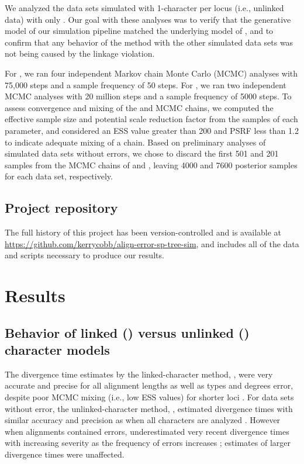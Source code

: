 We analyzed the data sets simulated with 1-character per locus (i.e., unlinked
data) with only \ecoevolity.
Our goal with these analyses was to
verify that the generative model of our simulation pipeline matched the
underlying model of \ecoevolity, and to confirm that any behavior of the method
with the other simulated data sets was not being caused by the linkage
violation.

For \ecoevolity, we ran four independent Markov chain Monte Carlo (MCMC)
analyses with 75,000 steps and a sample frequency of 50 steps.
For \beast, we ran two independent MCMC analyses with 20 million steps and a
sample frequency of 5000 steps. 
To assess convergence and mixing of the \ecoevolity and \beast MCMC chains, we
computed the effective sample size
\citep[ESS;][]{Gong2014}
and potential scale reduction factor
\citep[PSRF; the square root of Equation 1.1 in][]{Brooks1998}
from the samples of each parameter, and considered an ESS value greater
than 200 and PSRF less than 1.2 \citep{gelman1998} to indicate adequate mixing
of a chain. 
Based on preliminary analyses of simulated data sets without errors,
we chose to discard the first 501 and 201 samples from
the MCMC chains of \ecoevolity and \beast, leaving 4000 and
7600 posterior samples for each data set, respectively.


\subsection{Project repository}
The full history of this project has been version-controlled and is available
at
\url{https://github.com/kerrycobb/align-error-sp-tree-sim},
and includes
all of the data and scripts necessary to produce our results.


\section{Results}

\subsection{Behavior of linked (\beast) versus unlinked (\ecoevolity) character
    models}
    
The divergence time estimates by the linked-character method, \beast, were very
accurate and precise for all alignment lengths as well as types and degrees
error, despite poor MCMC mixing (i.e., low ESS values) for shorter loci
\timefigsp. 
For data sets without error, the unlinked-character method, \ecoevolity,
estimated divergence times with similar accuracy and precision as \beast when
all characters are analyzed \timefigsp.
However when alignments contained errors, \ecoevolity underestimated very
recent divergence times with increasing severity as the frequency of errors
increases \timefigsp; estimates of larger divergence times were unaffected.

